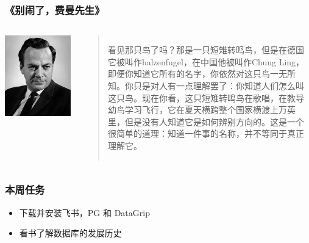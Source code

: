 \documentclass[aspectratio=169, 14pt]{beamer}
\begin{document}
\begin{frame}
    \frametitle{《别闹了，费曼先生》}
    \begin{columns}
        \includegraphics[height=0.5\paperheight]{image/feynman}
        \begin{quote}
            看见那只鸟了吗？那是一只短雉转鸣鸟，但是在德国它被叫作halzenfugel，在中国他被叫作Chung Ling，\alert{即便你知道它所有的名字，你依然对这只鸟一无所知}。你只是对人有一点理解罢了：你知道人们怎么叫这只鸟。现在你看，这只短雉转鸣鸟在歌唱，在教导幼鸟学习飞行，它在夏天横跨整个国家横渡上万英里，但是没有人知道它是如何辨别方向的。\alert{这是一个很简单的道理：知道一件事的名称，并不等同于真正理解它}。
        \end{quote} 
    \end{columns}
    

\end{frame}

\begin{frame}
    \frametitle{本周任务}
\begin{itemize}
    \item 下载并安装飞书，PG 和 DataGrip
    \item 看书了解数据库的发展历史
\end{itemize}    

\end{frame}
\end{document}
